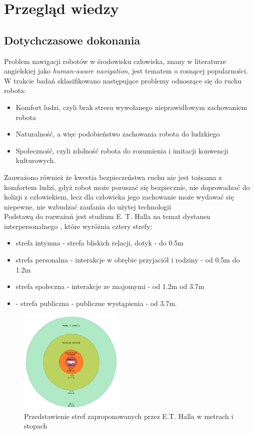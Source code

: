 \chapter{Przegląd wiedzy}

\section{Dotychczasowe dokonania}

Problem nawigacji robotów w środowisku człowieka, znany w literaturze angielskiej jako {\textit{human-aware navigation}}, jest tematem o rosnącej popularności. W trakcie badań sklasifikowano następujące problemy odnoszące się do ruchu robota\cite{survey}:

\begin{itemize}
\item Komfort ludzi, czyli brak stresu wywołanego nieprawidłowym zachowaniem robota
\item Naturalność, a więc podobieństwo zachowania robota do ludzkiego
\item Społeczność, czyli zdolność robota do rozumienia i imitacji konwencji kulturowych.
\end{itemize}

Zauważono również że kwestia bezpieczeństwa ruchu nie jest tożsama z komfortem ludzi, gdyż robot może poruszać się bezpiecznie, nie doprowadzać do kolizji z człowiekiem, lecz dla człowieka jego zachowanie może wydawać się niepewne, nie wzbudzać zaufania do użytej technologii \cite{survey} \\

\indent Podstawą do rozważań jest studium E. T. Halla na temat dystansu interpersonalnego \cite{dimension}, które wyróżnia cztery strefy:

\begin{itemize}
\item strefa intymna - strefa bliskich relacji, dotyk - do 0.5m
\item strefa personalna - interakcje w obrębie przyjaciół i rodziny - od 0.5m do 1.2m
\item strefa społeczna - interakcje ze znajomymi - od 1.2m od 3.7m
\item - strefa publiczna - publiczne wystąpienia - od 3.7m.
\end{itemize}

\begin{figure}[h]
	\centering
	\includegraphics[width=0.45\textwidth]{gfx/882px-Personal_Space.png}
	\caption{Przedstawienie stref zaproponowanych przez E.T. Halla w metrach i stopach\cite{dimension_zones}}
	\label{fig:hall_zones}
\end{figure}

